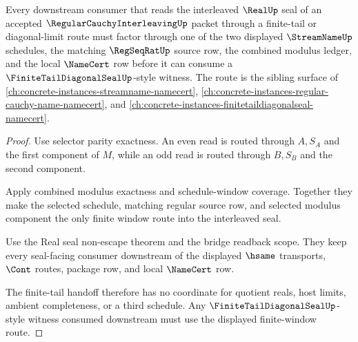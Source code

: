 \begin{theorem}
\label{thm:regular-cauchy-interleaving-finite-tail-consumer-boundary}
Every downstream consumer that reads the interleaved $\RealUp$ seal of an accepted $\RegularCauchyInterleavingUp$ packet through a finite-tail or diagonal-limit route must factor through one of the two displayed $\StreamNameUp$ schedules, the matching $\RegSeqRatUp$ source row, the combined modulus ledger, and the local $\NameCert$ row before it can consume a $\FiniteTailDiagonalSealUp$-style witness. The route is the sibling surface of \autoref{ch:concrete-instances-streamname-namecert}, \autoref{ch:concrete-instances-regular-cauchy-name-namecert}, and \autoref{ch:concrete-instances-finitetaildiagonalseal-namecert}.
\end{theorem}
\begin{proof}
Use selector parity exactness. An even read is routed through $A,S_A$ and the first component of $M$, while an odd read is routed through $B,S_B$ and the second component.

Apply combined modulus exactness and schedule-window coverage. Together they make the selected schedule, matching regular source row, and selected modulus component the only finite window route into the interleaved seal.

Use the Real seal non-escape theorem and the bridge readback scope. They keep every seal-facing consumer downstream of the displayed $\hsame$ transports, $\Cont$ routes, package row, and local $\NameCert$ row.

The finite-tail handoff therefore has no coordinate for quotient reals, host limits, ambient completeness, or a third schedule. Any $\FiniteTailDiagonalSealUp$-style witness consumed downstream must use the displayed finite-window route.
\end{proof}


